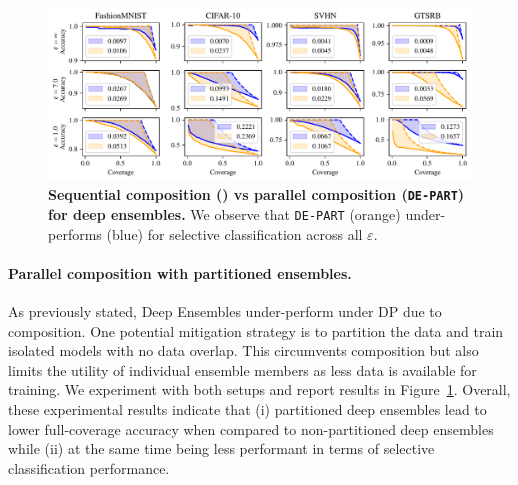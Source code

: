 \begin{figure}[t]
  \centering
  \includegraphics[width=\linewidth]{figs/sptd_dp/cov_acc_de_bound}
\caption[Sequential composition (\de) vs parallel composition (\texttt{DE-PART}) for deep ensembles.]{\textbf{Sequential composition (\de) vs parallel composition (\texttt{DE-PART}) for deep ensembles.} We observe that \texttt{DE-PART} (orange) under-performs \de (blue) for selective classification across all $\varepsilon$.}
\label{fig:acc_cov_bound_de}
\end{figure}

\paragraph{Parallel composition with partitioned ensembles.}

As previously stated, Deep Ensembles under-perform under DP due to composition. One potential mitigation strategy is to partition the data and train isolated models with no data overlap. This circumvents composition but also limits the utility of individual ensemble members as less data is available for training. We experiment with both setups and report results in Figure~\ref{fig:acc_cov_bound_de}. Overall, these experimental results indicate that (i) partitioned deep ensembles lead to lower full-coverage accuracy when compared to non-partitioned deep ensembles while (ii) at the same time being less performant in terms of selective classification performance.



